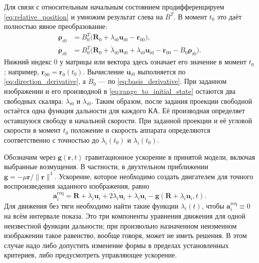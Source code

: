 \documentclass[a4paper,12pt]{article}
\begin{document}
Для связи с относительным начальным состоянием продифференцируем
\eqref{eq:relative_position} и умножим результат слева на $B^T$.
В момент $t_0$ это даёт полностью явное преобразование:
\begin{equation}
\begin{aligned}
 \boldsymbol\rho_{i0}
   &=B_0^T\bigl(\mathbf R_0+\lambda_{i0}\mathbf u_{i0}
                    -\mathbf r_{00}\bigr),\\
 \dot{\boldsymbol\rho}_{i0}
   &=B_0^T\bigl(\dot{\mathbf R}_0+\dot\lambda_{i0}\mathbf u_{i0}
       +\lambda_{i0}\dot{\mathbf u}_{i0}
       -\dot{\mathbf r}_{00}-\dot B_0\boldsymbol\rho_{i0}\bigr).
\end{aligned}
\label{eq:range_to_initial_state}
\end{equation}
Нижний индекс $0$ у матрицы или вектора здесь означает его значение
в момент $t_0$; например, $\mathbf r_{00}=\mathbf r_0(t_0)$.
Вычисление $\dot{\mathbf u}_{i0}$ выполняется по
\eqref{eq:direction_derivative}, а $\dot B_0$ --- по
\eqref{eq:basis_derivative}. При заданном изображении и его производной
в \eqref{eq:range_to_initial_state} остаются два свободных скаляра:
$\lambda_{i0}$ и $\dot\lambda_{i0}$.
Таким образом, после задания проекции свободной остаётся одна функция дальности для каждого КА. Её производная определяет оставшуюся свободу в начальной скорости. При заданной проекции и её угловой скорости в момент $t_0$ положение и скорость аппарата определяются соответственно с точностью до $\lambda_i(t_0)$ и $\dot\lambda_i(t_0)$.

Обозначим через $\mathbf g(\mathbf r,t)$ гравитационное ускорение в принятой модели, включая выбранные возмущения. В частности, в двухтельном приближении $\mathbf g=-\mu\mathbf r/\|\mathbf r\|^3$. Ускорение, которое необходимо создать двигателем для точного воспроизведения заданного изображения, равно
\begin{equation}
    \mathbf a_i^{\mathrm{req}}
    =\ddot{\mathbf R}+\ddot\lambda_i\mathbf u_i
       +2\dot\lambda_i\dot{\mathbf u}_i
       +\lambda_i\ddot{\mathbf u}_i
       -\mathbf g(\mathbf R+\lambda_i\mathbf u_i,t).
    \label{eq:control_from_range}
\end{equation}
Для движения без тяги необходимо найти такие функции $\lambda_i(t)$, чтобы $\mathbf a_i^{\mathrm{req}}\equiv0$ на всём интервале показа. Это три компоненты уравнения движения для одной неизвестной функции дальности; при произвольно назначенном неизменном изображении такое равенство, вообще говоря, может не иметь решения. В этом случае надо либо допустить изменение формы в пределах установленных критериев, либо предусмотреть управляющее ускорение.
\end{document}

